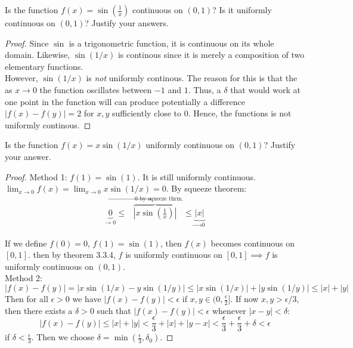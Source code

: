 \documentclass[12pt]{book}
\newenvironment{exercise}[2][Exercise]{\begin{trivlist}
\item[\hskip \labelsep {\bfseries #1}\hskip \labelsep {\bfseries #2.}]}{\end{trivlist}}
\begin{document}
\begin{exercise}{3.3.9}
Is the function $f(x)=\sin(\frac{1}{x})$ continuous on $(0,1)$? Is it uniformly continuous on $(0,1)$? Justify your answers. 
	
	\begin{proof}
	Since $\sin$ is a trigonometric function, it is continuous on its whole domain. Likewise, $\sin(1/x)$ is continous since it is merely a composition of two elementary functions. \\
	However, $\sin(1/x)$ is \emph{not} uniformly continous. The reason for this is that the as $x \to 0$ the function oscillates between $-1$ and $1$. Thus, a $\delta$ that would work at one point in the function will can produce potentially a difference $|f(x)-f(y)|=2$ for $x,y$ sufficiently close to 0. Hence, the functions is not uniformly continous.
	\end{proof}
\end{exercise}


\begin{exercise}{3.3.10}
    Is the function $f(x)=x \sin(1/x)$ uniformly continuous on $(0,1)$? Justify your answer. \\
    
    \begin{proof}
    Method 1: $f(1)=\sin(1)$. It is still uniformly continuous. $\lim_{x \to 0} f(x)= \lim_{x \to 0} x \sin(1/x) = 0$. By squeeze theorem:
		\begin{align*}
		\underbrace{0}_\text{$\to$ 0} \leq \overbrace{|x \sin \left( \frac{1}{x} \right) |}^\text{$\to$ 0 by squeeze thrm.} \leq \underbrace{|x|}_\text{$\to$ 0}
		\end{align*}		       
         
    If we define $f(0)=0$, $f(1)=\sin(1)$, then $f(x)$ becomes continuous on $[0,1]$. then by theorem 3.3.4, $f$ is uniformly continuous on $[0,1] \implies f$ is uniformly continuous on $(0,1)$.\\
    Method 2: 
        \[ |f(x)-f(y)| = |x \sin(1/x) - y \sin(1/y)| \leq |x \sin(1/x)| + |y \sin(1/y)| \leq |x|+|y| \]
    Then for all $\epsilon>0$ we have $|f(x)-f(y)|<\epsilon$ if $x,y \in (0,\frac{\epsilon}{2}]$. If now $x,y > \epsilon/3$, then there exists a $\delta>0$ such that $|f(x)-f(y)| <\epsilon$ whenever $|x-y| < \delta$: 
        \[ |f(x)-f(y)| \leq |x|+|y| < \frac{\epsilon}{3} + |x| + |y-x| < \frac{\epsilon}{3} + \frac{\epsilon}{3}+ \delta < \epsilon \]
    if $\delta< \frac{\epsilon}{3}$. Then we choose $\delta= \min(\frac{\epsilon}{3}, \delta_0)$.
    \end{proof}
\end{exercise}
\end{document}
